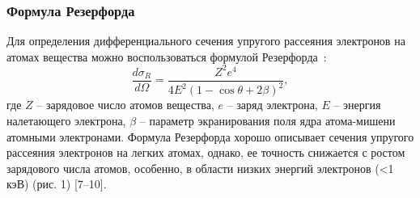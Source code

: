 \subsubsection{Формула Резерфорда}
Для определения дифференциального сечения упругого рассеяния электронов на атомах вещества можно воспользоваться формулой Резерфорда~\cite{Dapor_large_book}:
\begin{equation} \label{eq:models_3}
	\frac{d \sigma_R}{d \Omega}=\frac{Z^2 e^4}{4 E^2(1-\cos \theta+2 \beta)^2},
\end{equation}
где $Z$ -- зарядовое число атомов вещества, $e$ -- заряд электрона, $E$ -- энергия налетающего электрона, $\beta$ -- параметр экранирования поля ядра атома-мишени атомными электронами. Формула Резерфорда хорошо описывает сечения упругого рассеяния электронов на легких атомах, однако, ее точность снижается с ростом зарядового числа атомов, особенно, в области низких энергий электронов (<1 кэВ) (рис. 1) [7–10].

